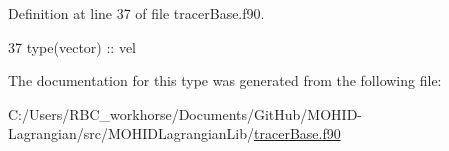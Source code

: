 Definition at line 37 of file tracer\+Base.\+f90.


\begin{DoxyCode}
37         \textcolor{keywordtype}{type}(vector) :: vel
\end{DoxyCode}


The documentation for this type was generated from the following file\+:\begin{DoxyCompactItemize}
\item 
C\+:/\+Users/\+R\+B\+C\+\_\+workhorse/\+Documents/\+Git\+Hub/\+M\+O\+H\+I\+D-\/\+Lagrangian/src/\+M\+O\+H\+I\+D\+Lagrangian\+Lib/\mbox{\hyperlink{tracer_base_8f90}{tracer\+Base.\+f90}}\end{DoxyCompactItemize}
